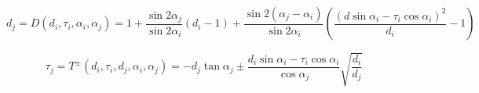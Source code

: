 \documentclass[a4paper]{article}
\begin{document}
\begin{equation} 
 \label{GrindEQ__24_}
{d_j} =D\left(d_{i} ,\tau _{i} ,\alpha _{i} ,\alpha _{j}\right)= 1 + \frac{{\sin 2{\alpha _j}}}{{\sin 2{\alpha _i}}}\left( {{d_i} - 1} \right) + \frac{{\sin 2\left( {{\alpha _j} - {\alpha _i}} \right)}}{{\sin 2{\alpha _i}}}\left( {\frac{{{{\left( {d\sin {\alpha _i} - {\tau _i}\cos {\alpha _i}} \right)}^2}}}{{{d_i}}} - 1} \right) 
\end{equation}

\begin{equation} 
 \label{GrindEQ__25_} {\tau _j} = T^{\pm }\left(d_{i} ,\tau _{i} ,d_{j},\alpha_i,\alpha_j \right)= - {d_j}\tan {\alpha _j} \pm \frac{{{d_i}\sin {\alpha _i} - {\tau _i}\cos {\alpha _i}}}{{\cos {\alpha _j}}}\sqrt {\frac{{{d_i}}}{{{d_j}}}}
\end{equation}


%
 
\end{document}
